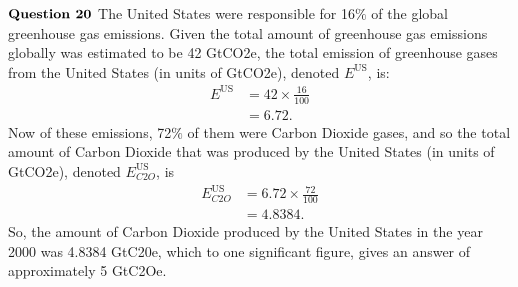 \documentclass{article}
\begin{document}
$\textbf{Question 20} \\$
The United States were responsible for 16$\%$ of the global greenhouse gas emissions. Given the total amount of greenhouse gas emissions globally was estimated to be 42 GtCO2e, the total emission of greenhouse gases from the United States (in units of GtCO2e), denoted $E^{\text{US}}$, is:
\begin{align*}
E^{\text{US}} &= 42 \times \frac{16}{100}\\
&= 6.72.
\end{align*}
Now of these emissions, 72$\%$ of them were Carbon Dioxide gases, and so the total amount of Carbon Dioxide that was produced by the United States (in units of GtCO2e), denoted $E^{\text{US}}_{C2O}$, is
\begin{align*}
E^{\text{US}}_{C2O} &= 6.72 \times \frac{72}{100}\\
&= 4.8384.
\end{align*}
So, the amount of Carbon Dioxide produced by the United States in the year 2000 was 4.8384 GtC20e, which to one significant figure, gives an answer of approximately 5 GtC2Oe.
\end{document}
